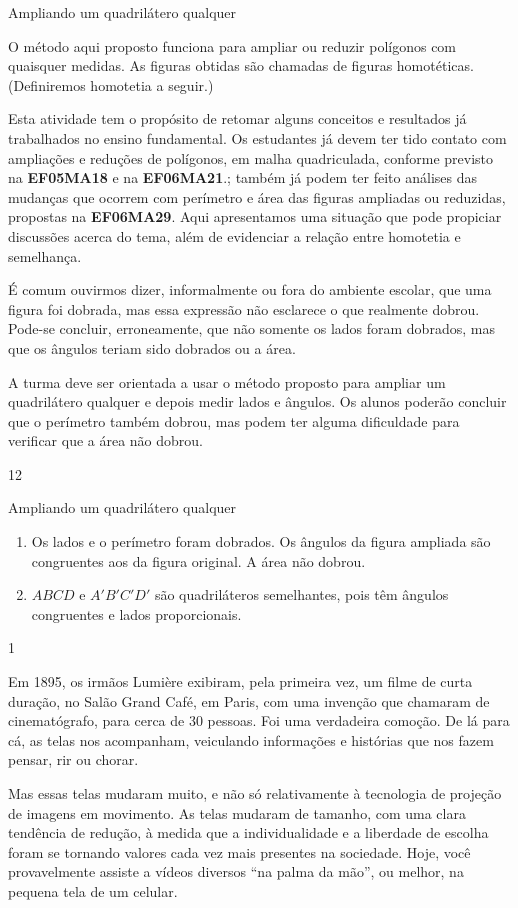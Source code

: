 \begin{sugestions}{Ampliando um quadrilátero qualquer}
{
O método aqui proposto funciona para ampliar ou reduzir polígonos com quaisquer medidas. As figuras obtidas são chamadas de figuras homotéticas. (Definiremos homotetia a seguir.)

Esta atividade tem o propósito de retomar alguns conceitos e resultados já trabalhados no ensino fundamental.  Os estudantes já devem ter tido contato com ampliações e reduções de polígonos, em malha quadriculada, conforme previsto na \textbf{EF05MA18} e na \textbf{EF06MA21}.; também já podem ter feito análises das mudanças que ocorrem com perímetro e área das figuras ampliadas ou reduzidas, propostas na \textbf{EF06MA29}.  Aqui apresentamos uma situação que pode propiciar discussões acerca do tema, além de evidenciar a relação entre homotetia e semelhança. 

É comum ouvirmos dizer, informalmente ou fora do ambiente escolar, que uma figura foi dobrada, mas essa expressão não esclarece o que realmente dobrou. Pode-se concluir, erroneamente, que não somente os lados foram dobrados, mas que os ângulos teriam sido dobrados ou a área. 

A turma deve ser orientada a usar o método proposto para ampliar um quadrilátero qualquer e depois medir lados e ângulos. Os alunos poderão concluir que o perímetro também dobrou, mas podem ter alguma dificuldade para verificar que a área não dobrou.  

}{1}{2}
\end{sugestions}
\begin{answer}{Ampliando um quadrilátero qualquer}
{
\begin{enumerate}
\item Os lados e o perímetro foram dobrados. Os ângulos da figura ampliada são congruentes aos da figura original. A área não dobrou. 
\item $ABCD$ e $A'B'C'D'$ são quadriláteros semelhantes, pois têm ângulos congruentes e lados proporcionais.
\end{enumerate}
}{1}
\end{answer}

Em 1895, os irmãos Lumière exibiram, pela primeira vez, um filme de curta duração, no Salão Grand Café, em Paris, com uma invenção que chamaram de cinematógrafo, para cerca de 30 pessoas. Foi uma verdadeira comoção. De lá para cá, as telas nos acompanham, veiculando informações e histórias que nos fazem pensar, rir ou chorar.

Mas essas telas mudaram muito, e não só relativamente à tecnologia de projeção de imagens em movimento. As telas mudaram de tamanho, com uma clara tendência de redução, à medida que a individualidade e a liberdade de escolha foram se tornando valores cada vez mais presentes na sociedade. Hoje, você provavelmente assiste a vídeos diversos “na palma da mão”, ou melhor, na pequena tela de um celular.

